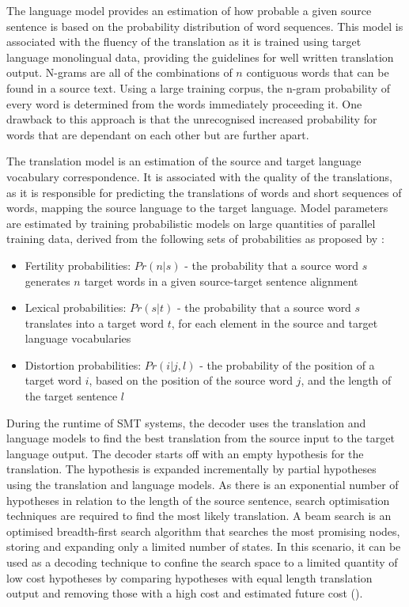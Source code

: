 The language model provides an estimation of how probable a given source sentence is based on the probability distribution of word sequences. This model is associated with the fluency of the translation as it is trained using target language monolingual data, providing the guidelines for well written translation output. N-grams are all of the combinations of $n$ contiguous words that can be found in a source text. Using a large training corpus, the n-gram probability of every word is determined from the words immediately proceeding it. One drawback to this approach is that the unrecognised increased probability for words that are dependant on each other but are further apart.

The translation model is an estimation of the source and target language vocabulary correspondence. It is associated with the quality of the translations, as it is responsible for predicting the translations of words and short sequences of words, mapping the source language to the target language. Model parameters are estimated by training probabilistic models on large quantities of parallel training data, derived from the following sets of probabilities as proposed by \cite{brown_statistical_1990}:
\begin{itemize}
    \item Fertility probabilities:  $Pr(n|s)$ - the probability that a source word $s$ generates $n$ target words in a given source-target sentence alignment
    
    \item Lexical probabilities: $Pr(s|t)$ - the probability that a source word $s$ translates into a target word $t$, for each element in the source and target language vocabularies
    
    \item Distortion probabilities: $Pr(i|j, l)$ - the probability of the position of a target word $i$, based on the position of the source word $j$, and the length of the target sentence $l$
\end{itemize}

During the runtime of \acrshort{SMT} systems, the decoder uses the translation and language models to find the best translation from the source input to the target language output. 
The decoder starts off with an empty hypothesis for the translation. The hypothesis is expanded incrementally by partial hypotheses using the translation and language models. As there is an exponential number of hypotheses in relation to the length of the source sentence, search optimisation techniques are required to find the most likely translation. A beam search is an optimised breadth-first search algorithm that searches the most promising nodes, storing and expanding only a limited number of states. In this scenario, it can be used as a decoding technique to confine the search space to a limited quantity of low cost hypotheses by comparing hypotheses with equal length translation output and removing those with a high cost and estimated future cost (\cite{koehn_pharaoh_2004}).

